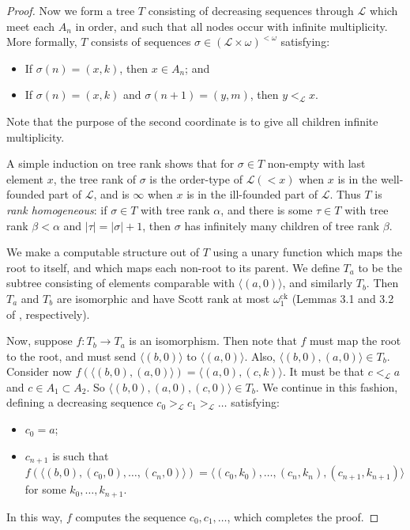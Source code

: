 \documentclass{amsart}
\newcommand\+[1]{\mathcal{#1}}
\renewcommand\*[1]{\mathbf{#1}}
\renewcommand\=[1]{\text{#1}}
\renewcommand\*[1]{\mathbf{#1}}
\newcommand{\ock}{\omega_{1}^{\mathrm{ck}}}
\begin{document}
\begin{proof}
Now we form a tree $T$ consisting of decreasing sequences through $\+L$ which meet each $A_n$ in order, and such that all nodes occur with infinite multiplicity.  More formally, $T$ consists of sequences $\sigma \in (\+L \times \omega)^{<\omega}$ satisfying:
\begin{itemize}
\item If $\sigma(n) = (x, k)$, then $x \in A_n$; and
\item If $\sigma(n) = (x, k)$ and $\sigma(n+1) = (y, m)$, then $y <_{\+L} x$.
\end{itemize}
Note that the purpose of the second coordinate is to give all children infinite multiplicity.

A simple induction on tree rank shows that for $\sigma \in T$ non-empty with last element $x$, the tree rank of $\sigma$ is the order-type of $\+L(< x)$ when $x$ is in the well-founded part of $\+L$, and is $\infty$ when $x$ is in the ill-founded part of $\+L$.  Thus $T$ is {\em rank homogeneous}: if $\sigma \in T$ with tree rank $\alpha$, and there is some $\tau \in T$ with tree rank $\beta < \alpha$ and $|\tau| = |\sigma|+1$, then $\sigma$ has infinitely many children of tree rank $\beta$.

We make a computable structure out of $T$ using a unary function which maps the root to itself, and which maps each non-root to its parent.  We define $T_a$ to be the subtree consisting of elements comparable with $\langle (a, 0)\rangle$, and similarly $T_b$.  Then $T_a$ and $T_b$ are isomorphic and have Scott rank at most $\ock$ (Lemmas 3.1 and 3.2 of \cite{ckm06}, respectively).

Now, suppose $f: T_b \to T_a$ is an isomorphism.  Then note that $f$ must map the root to the root, and must send $\langle (b,0)\rangle$ to $\langle (a,0) \rangle$.  Also, $\langle (b, 0), (a, 0)\rangle \in T_b$.  Consider now $f( \langle (b, 0), (a,0) \rangle) = \langle (a, 0), (c,k) \rangle$.  It must be that $c <_{\+L} a$ and $c \in A_1 \subset A_2$.  So $\langle (b, 0), (a, 0), (c, 0)\rangle \in T_b$.  We continue in this fashion, defining a decreasing sequence $c_0 >_{\+L} c_1 >_{\+L} \dots$ satisfying:
\begin{itemize}
\item $c_0 = a$;
\item $c_{n+1}$ is such that $f(\langle (b, 0), (c_0,0), \dots, (c_n, 0)\rangle) = \langle (c_0,k_0), \dots, (c_n, k_n), (c_{n+1}, k_{n+1})\rangle$ for some $k_0, \dots, k_{n+1}$.
\end{itemize}
In this way, $f$ computes the sequence $c_0, c_1, \dots$, which completes the proof.
\end{proof}
\end{document}
